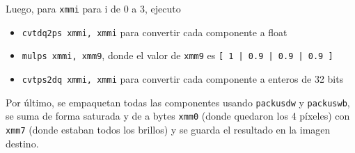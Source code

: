 \par Luego, para \texttt{xmmi} para i de 0 a 3, ejecuto
\begin{itemize}
	\item \texttt{cvtdq2ps xmmi, xmmi} para convertir cada componente a float
	\item \texttt{mulps xmmi, xmm9}, donde el valor de \texttt{xmm9} es \texttt{[ 1 | 0.9 | 0.9 | 0.9 ]}
	\item \texttt{cvtps2dq xmmi, xmmi} para convertir cada componente a enteros de 32 bits
\end{itemize}

\par Por último, se empaquetan todas las componentes usando \texttt{packusdw} y \texttt{packuswb}, se suma de forma saturada y de a bytes \texttt{xmm0} (donde quedaron los 4 píxeles) 
con \texttt{xmm7} (donde estaban todos los brillos) y se guarda el resultado en la imagen destino.